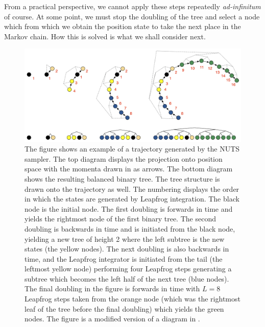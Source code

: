 From a practical perspective, we cannot apply these steps repeatedly \textit{ad-infinitum} of course. At some point, we must stop the doubling of the tree and select a node which from which we obtain the position state to take the next place in the Markov chain. How this is solved is what we shall consider next.


\begin{figure}[h!]
    \centering
    \includegraphics[scale=0.075]{figures/drawings/doubling3_with_numbering.png}
    \caption{The figure shows an example of a trajectory generated by the NUTS sampler. The top diagram displays the projection onto position space with the momenta drawn in as arrows. The bottom diagram shows the resulting balanced binary tree. The tree structure is drawn onto the trajectory as well. The numbering displays the order in which the states are generated by Leapfrog integration. The black node is the initial node. The first doubling is forwards in time and yields the rightmost node of the first binary tree. The second doubling is backwards in time and is initiated from the black node, yielding a new tree of height 2 where the left subtree is the new states (the yellow nodes). The next doubling is also backwards in time, and the Leapfrog integrator is initiated from the tail (the leftmost yellow node) performing four Leapfrog steps generating a subtree which becomes the left half of the next tree (blue nodes). The final doubling in the figure is forwards in time with $L = 8$ Leapfrog steps taken from the orange node (which was the rightmost leaf of the tree before the final doubling) which yields the green nodes. The figure is a modified version of a diagram in \cite{nuts}.}\label{fig:nuts_trajectory}
\end{figure}

